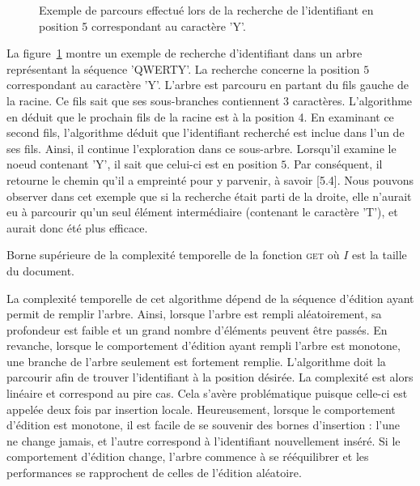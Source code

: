 \begin{figure}
  \centering
  
  \caption{\label{repl:fig:getexample} Exemple de parcours effectué lors de la
    recherche de l'identifiant en position 5 correspondant au caractère 'Y'.}
\end{figure}

La figure~\ref{repl:fig:getexample} montre un exemple de recherche d'identifiant
dans un arbre représentant la séquence 'QWERTY'. La recherche concerne la
position $5$ correspondant au caractère 'Y'. L'arbre est parcouru en partant du
fils gauche de la racine. Ce fils sait que ses sous-branches contiennent 3
caractères. L'algorithme en déduit que le prochain fils de la racine est à la
position 4. En examinant ce second fils, l'algorithme déduit que l'identifiant
recherché est inclue dans l'un de ses fils. Ainsi, il continue l'exploration
dans ce sous-arbre. Lorsqu'il examine le noeud contenant 'Y', il sait que
celui-ci est en position $5$. Par conséquent, il retourne le chemin qu'il a
empreinté pour y parvenir, à savoir [5.4]. Nous pouvons observer dans cet
exemple que si la recherche était parti de la droite, elle n'aurait eu à
parcourir qu'un seul élément intermédiaire (contenant le caractère 'T'), et
aurait donc été plus efficace.


\begin{wraptable}{r}{0.5\textwidth}
  
  \caption{\label{repl:table:get} Borne supérieure de la complexité temporelle de la fonction \textsc{get} où $I$ est la taille du document.}  
\end{wraptable}

La complexité temporelle de cet algorithme dépend de la séquence d'édition ayant
permit de remplir l'arbre. Ainsi, lorsque l'arbre est rempli aléatoirement, sa
profondeur est faible et un grand nombre d'éléments peuvent être passés. En
revanche, lorsque le comportement d'édition ayant rempli l'arbre est monotone,
une branche de l'arbre seulement est fortement remplie. L'algorithme doit la
parcourir afin de trouver l'identifiant à la position désirée. La complexité est
alors linéaire et correspond au pire cas. Cela s'avère problématique puisque
celle-ci est appelée deux fois par insertion locale. Heureusement, lorsque le
comportement d'édition est monotone, il est facile de se souvenir des bornes
d'insertion : l'une ne change jamais, et l'autre correspond à l'identifiant
nouvellement inséré. Si le comportement d'édition change, l'arbre commence à se
rééquilibrer et les performances se rapprochent de celles de l'édition
aléatoire.


